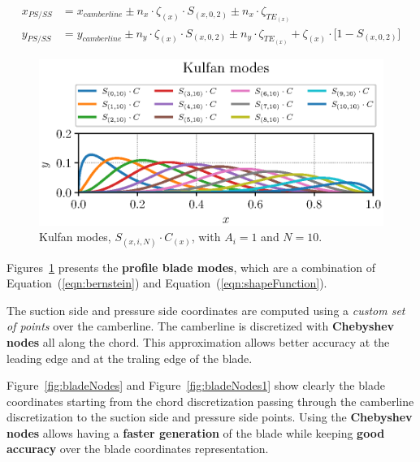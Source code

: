 \begin{align}
  x_{PS/SS} & = x_{camberline} \pm n_x \cdot \zeta_{(x)} \cdot S_{(x, 0, 2)} \pm n_x \cdot \zeta_{TE_{(x)}}\\ 
  y_{PS/SS} & = y_{camberline} \pm n_y \cdot \zeta_{(x)} \cdot S_{(x, 0, 2)} \pm n_y \cdot \zeta_{TE_{(x)}}+ \zeta_{(x)} \cdot \big[1 - S_{(x, 0, 2)}\big]
\end{align}

\begin{figure}[H]
    \centering
    \includegraphics[scale=0.9]{pyFigure/figures/kulfan.eps}
    \caption{Kulfan modes, $S_{(x, i, N)} \cdot C_{(x)}$, with $A_i = 1$ and $N = 10$.}
    \label{fig:kulfan}
\end{figure}

Figures~\ref{fig:kulfan} presents the \textbf{profile blade modes}, which are a combination of Equation~(\ref{eqn:bernstein}) and Equation~(\ref{eqn:shapeFunction}).

The suction side and pressure side coordinates are computed using a \textit{custom set of points} over the camberline.
The camberline is discretized with \textbf{Chebyshev nodes} all along the chord. This approximation allows better accuracy at the leading edge and at the traling edge of the blade.

Figure~\ref{fig:bladeNodes} and Figure~\ref{fig:bladeNodes1} show clearly the blade coordinates starting from the chord discretization passing through the camberline discretization to the suction side and pressure side points.
Using the \textbf{Chebyshev nodes} allows having a \textbf{faster generation} of the blade while keeping \textbf{good accuracy} over the blade coordinates representation. 

